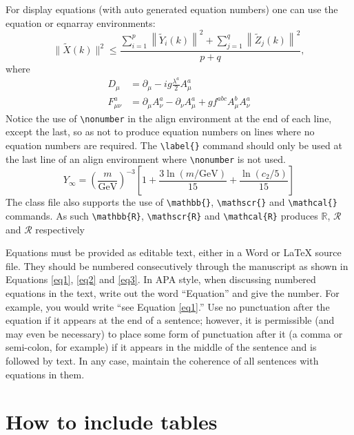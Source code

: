 \documentclass[12pt,a4paper]{article}
\begin{document}
For display equations (with auto generated equation numbers)
one can use the equation or eqnarray environments:
\begin{equation}
\|\tilde{X}(k)\|^2 \leq\frac{\sum\limits_{i=1}^{p}\left\|\tilde{Y}_i(k)\right\|^2+\sum\limits_{j=1}^{q}\left\|\tilde{Z}_j(k)\right\|^2 }{p+q},
\label{eq1}
\end{equation}
where
\begin{align}
D_\mu &=  \partial_\mu - ig \frac{\lambda^a}{2} A^a_\mu \nonumber \\
F^a_{\mu\nu} &= \partial_\mu A^a_\nu - \partial_\nu A^a_\mu + g f^{abc} A^b_\mu A^a_\nu
\label{eq2}
\end{align}
Notice the use of \verb+\nonumber+ in the align environment at the end
of each line, except the last, so as not to produce equation numbers on
lines where no equation numbers are required. The \verb+\label{}+ command
should only be used at the last line of an align environment where
\verb+\nonumber+ is not used.
\begin{equation}
Y_\infty = \left( \frac{m}{\textrm{GeV}} \right)^{-3}
    \left[ 1 + \frac{3 \ln(m/\textrm{GeV})}{15}
    + \frac{\ln(c_2/5)}{15} \right]
\label{eq3}
\end{equation}
The class file also supports the use of \verb+\mathbb{}+, \verb+\mathscr{}+ and
\verb+\mathcal{}+ commands. As such \verb+\mathbb{R}+, \verb+\mathscr{R}+
and \verb+\mathcal{R}+ produces $\mathbb{R}$, $\mathscr{R}$ and $\mathcal{R}$
respectively 

Equations must be provided as editable text, either in a Word or LaTeX source file. They should be numbered consecutively through the manuscript as shown in Equations \ref{eq1}, \ref{eq2} and \ref{eq3}. In APA style, when discussing numbered equations in the text, write out the word “Equation” and give the number. For example, you would write “see Equation \ref{eq1}.”
Use no punctuation after the equation if it appears at the end of a sentence; however, it is permissible (and may even be necessary) to place some form of punctuation after it (a comma or semi-colon, for example) if it appears in the middle of the sentence and is followed by text. In any case, maintain the coherence of all sentences with equations in them.


\section{How to include tables}\label{sec5}
\end{document}
